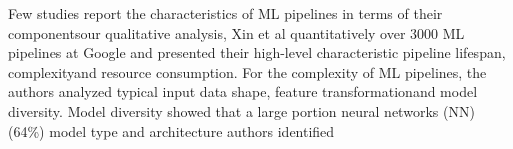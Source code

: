 Few studies report \DIFdelbegin {}\DIFdelend the characteristics of ML pipelines \DIFdelbegin \DIFdel{, }\DIFdelend in terms of their components\DIFdelbegin {}\DIFdelend \DIFaddbegin {}\DIFaddend our qualitative analysis, Xin et al \cite{Doris2021MLPipelines} quantitatively \DIFdelbegin {}\DIFdelend \DIFaddbegin {}\DIFaddend over 3000 ML pipelines at Google and presented their high-level characteristic \DIFdelbegin {}\DIFdelend \DIFaddbegin {}\DIFaddend pipeline lifespan, complexity\DIFaddbegin \DIFadd{, }\DIFaddend and resource consumption. For the complexity of ML pipelines, the authors analyzed typical input data shape, feature transformation\DIFaddbegin \DIFadd{, }\DIFaddend and model diversity. Model diversity showed that a large portion \DIFdelbegin {}\DIFdelend \DIFaddbegin {}\DIFaddend neural networks (NN) (64\%) \DIFdelbegin {}\DIFdelend \DIFaddbegin {}\DIFaddend model type and architecture \DIFdelbegin {}\DIFdelend \DIFaddbegin {}\DIFaddend authors \cite{Doris2021MLPipelines} identified \DIFdelbegin {}%


